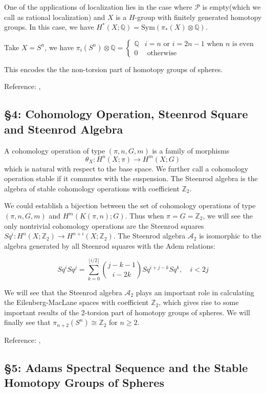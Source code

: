 \documentclass[12pt, reqno]{amsart}
\theoremstyle{definition}
\theoremstyle{remark}
\numberwithin{equation}{section}
\begin{document}
{One of the applications of localization lies in the case where $\mathcal{P}$ is empty(which we call as rational localization) and $X$ is a $H$-group with finitely generated homotopy groups. In this case, we have $H^*(X; \mathbb{Q}) = \mathrm{Sym}(\pi_*(X) \otimes \mathbb{Q})$.

Take $X=S^n$, we have $\pi_i(S^n) \otimes \mathbb{Q} = \begin{cases}\mathbb{Q} & i=n \text{ or } i=2n-1 \text{ when } n \text{ is even}\\
0 & \text{ otherwise}\end{cases}$

This encodes the the non-torsion part of homotopy groups of spheres.

Reference: \cite{May11}, \cite{HatSS}

\subsection*{\textbf{§4: Cohomology Operation, Steenrod Square and Steenrod Algebra}}

A cohomology operation of type $(\pi, n, G, m)$ is a family of morphisms \[ \theta_X: H^n(X; \pi) \to H^m(X; G) \] which is natural with respect to the base space. We further call a cohomology operation stable if it commutes with the suspension. The Steenrod algebra is the algebra of stable cohomology operations with coefficient $\mathbb{Z}_2$.

We could establish a bijection between the set of cohomology operations of type $(\pi, n, G, m)$ and $H^m(K(\pi, n); G)$. Thus when $\pi=G=\mathbb{Z}_2$, we will see the only nontrivial cohomology operations are the Steenrod squares $Sq^i: H^n(X; \mathbb{Z}_2) \to H^{n+i}(X; \mathbb{Z}_2)$. The Steenrod algebra $\mathcal{A}_2$ is isomorphic to the algebra generated by all Steenrod squares with the Adem relations: 

\[ Sq^i Sq^j = \sum_{k=0}^{\lfloor i/2 \rfloor} \binom{j-k-1}{i-2k} Sq^{i+j-k} Sq^k, \quad i<2j \]

We will see that the Steenrod algebra $\mathcal{A}_2$ plays an important role in calculating the Eilenberg-MacLane spaces with coefficient $\mathbb{Z}_2$, which gives rise to some important results of the 2-torsion part of homotopy groups of spheres. We will finally see that $\pi_{n+2}(S^n) \cong \mathbb{Z}_2$ for $n \geq 2$.

Reference: \cite{Hat02}, \cite{MT08}

\subsection*{\textbf{§5: Adams Spectral Sequence and the Stable Homotopy Groups of Spheres}}

}
\end{document}
